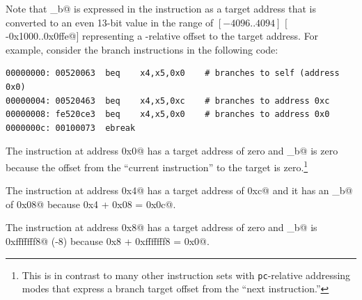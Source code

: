 Note that \verb@imm_b@ is expressed in the instruction as a target
address that is converted to an even 13-bit value in the range of
$[-4096..4094]$ $[$\verb@-0x1000..0x0ffe@$]$ representing a \verb@pc@-relative offset to the
target address. For example, consider the branch instructions in
the following code:

\begin{verbatim}
00000000: 00520063  beq    x4,x5,0x0    # branches to self (address 0x0)
00000004: 00520463  beq    x4,x5,0xc    # branches to address 0xc
00000008: fe520ce3  beq    x4,x5,0x0    # branches to address 0x0
0000000c: 00100073  ebreak
\end{verbatim}

The instruction at address \verb@0x0@ has a target address of zero and
\verb@imm_b@ is zero because the offset from the ``current instruction''
to the target is zero.\footnote{This is in contrast to many other
instruction sets with \texttt{pc}-relative addressing modes that express
a branch target offset from the ``next instruction.''}

The instruction at address \verb@0x4@ has a target address of \verb@0xc@
and it has an \verb@imm_b@ of \verb@0x08@ because \verb@0x4 + 0x08 = 0x0c@.

The instruction at address \verb@0x8@ has a target address of zero and
\verb@imm_b@ is \verb@0xfffffff8@ (-8) because \verb@0x8 + 0xfffffff8 = 0x0@.

